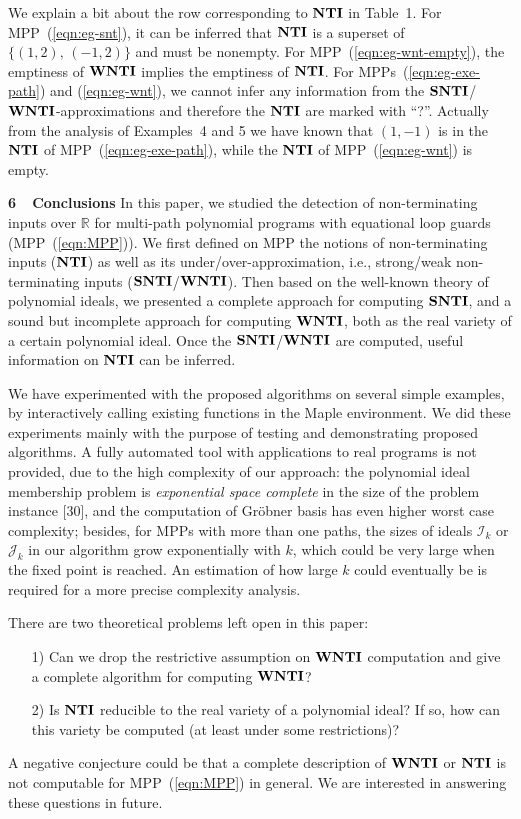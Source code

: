 \documentclass{article}
\def\dse#1{\vskip 0.6cm\noindent
        {\large\bf #1}
        \vskip 0.4cm}
\newcommand{\I}{\mathcal{I}}
\newcommand{\J}{\mathcal{J}}
\newcommand{\NTI}{{\bf NTI}}
\newcommand{\SNTI}{{\bf SNTI}}
\newcommand{\WNTI}{{\bf WNTI}}
\begin{document}
We explain a bit about the row corresponding to $\NTI$ in Table~1. For MPP~(\ref{eqn:eg-snt}), it can be inferred that $\NTI$ is a superset of $\{(1,2),\,(-1,2)\}$ and must be nonempty. For MPP~(\ref{eqn:eg-wnt-empty}), the emptiness of $\WNTI$ implies the emptiness of $\NTI$. For MPPs~(\ref{eqn:eg-exe-path}) and (\ref{eqn:eg-wnt}), we cannot infer any information from the $\SNTI$/$\WNTI$-approximations and therefore the $\NTI$ are marked with ``?''. Actually from the analysis of Examples~4 and 5 we have known that $(1,-1)$ is in the $\NTI$ of MPP~(\ref{eqn:eg-exe-path}), while the $\NTI$ of MPP~(\ref{eqn:eg-wnt}) is empty.

\dse{6~~Conclusions}
In this paper, we studied the detection of non-terminating inputs over $\mathbb{R}$ for multi-path polynomial programs with equational loop guards (MPP~(\ref{eqn:MPP})). We first defined on MPP the notions of non-terminating inputs ($\NTI$) as well as its under/over-approximation, i.e., strong/weak non-terminating inputs ($\SNTI$/$\WNTI$). Then based on the well-known theory of polynomial ideals, we presented a complete approach for computing $\SNTI$, and a sound but incomplete approach for computing $\WNTI$, both as the real variety of a certain polynomial ideal. Once the $\SNTI$/$\WNTI$ are computed, useful information on $\NTI$ can be inferred.

We have experimented with the proposed algorithms on several simple examples, by interactively calling existing functions in the {\sc Maple} environment. We did these experiments mainly with the purpose of testing and demonstrating proposed algorithms. A fully automated tool with applications to real programs is not provided, due to the high complexity of our approach: the polynomial ideal membership problem is \emph{exponential space complete} in the size of the problem instance [30], and the computation of Gr\"obner basis has even higher worst case complexity; besides, for MPPs with more than one paths, the sizes of ideals $\I_k$ or $\J_k$ in our algorithm grow exponentially with $k$, which could be very large when the fixed point is reached. An estimation of how large $k$ could eventually be is required for a more precise complexity analysis.

There are two theoretical problems left open in this paper:
\begin{enumerate}
\item[1)] Can we drop the restrictive assumption on $\WNTI$ computation and give a complete algorithm for computing $\WNTI$?
\item[2)] Is $\NTI$ reducible to the real variety of a polynomial ideal? If so, how can this variety be computed (at least under some restrictions)?
\end{enumerate}
A negative conjecture could be that a complete description of $\WNTI$ or $\NTI$ is not computable for MPP~(\ref{eqn:MPP}) in general. We are interested in answering these questions in future.
\end{document}
